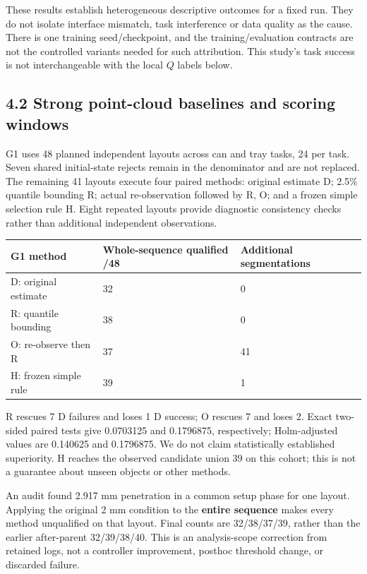 \documentclass[10pt]{article}
\begin{document}
These results establish heterogeneous descriptive outcomes for a fixed run. They do not isolate interface mismatch, task interference or data quality as the cause. There is one training seed/checkpoint, and the training/evaluation contracts are not the controlled variants needed for such attribution. This study's task success is not interchangeable with the local \(Q\) labels below.

\subsection*{4.2 Strong point-cloud baselines and scoring windows}

G1 uses 48 planned independent layouts across can and tray tasks, 24 per task. Seven shared initial-state rejects remain in the denominator and are not replaced. The remaining 41 layouts execute four paired methods: original estimate D; 2.5\% quantile bounding R; actual re-observation followed by R, O; and a frozen simple selection rule H. Eight repeated layouts provide diagnostic consistency checks rather than additional independent observations.

\par\noindent\begin{minipage}{\linewidth}\centering\small\setlength{\tabcolsep}{4pt}\begin{tabular}{p{}p{}p{}}\hline
G1 method & Whole-sequence qualified /48 & Additional segmentations \\ \hline
D: original estimate & 32 & 0 \\
R: quantile bounding & 38 & 0 \\
O: re-observe then R & 37 & 41 \\
H: frozen simple rule & 39 & 1 \\
\hline\end{tabular}\end{minipage}\par\medskip

R rescues 7 D failures and loses 1 D success; O rescues 7 and loses 2. Exact two-sided paired tests give 0.0703125 and 0.1796875, respectively; Holm-adjusted values are 0.140625 and 0.1796875. We do not claim statistically established superiority. H reaches the observed candidate union 39 on this cohort; this is not a guarantee about unseen objects or other methods.

An audit found 2.917 mm penetration in a common setup phase for one layout. Applying the original 2 mm condition to the \textbf{entire sequence} makes every method unqualified on that layout. Final counts are 32/38/37/39, rather than the earlier after-parent 32/39/38/40. This is an analysis-scope correction from retained logs, not a controller improvement, posthoc threshold change, or discarded failure.
\end{document}
